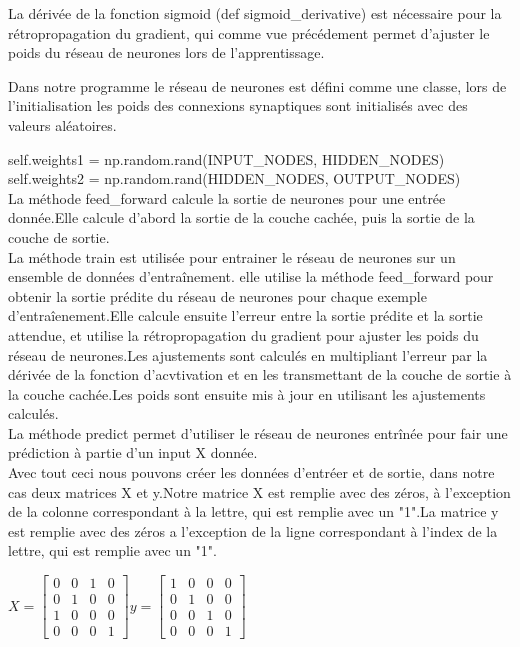 \documentclass{article}
\def\abc#1{\begingroup\escapechar-1 \expandafter\string\csname#1\endcsname\endgroup}
\begin{document}
La dérivée de la fonction sigmoid (def \abc{sigmoid_derivative}) est nécessaire pour la rétropropagation du gradient, qui comme vue précédement permet d'ajuster le poids du réseau de neurones lors de l'apprentissage. \

Dans notre programme le réseau de neurones est défini comme une classe, lors de l'initialisation les poids des connexions synaptiques sont initialisés avec des valeurs aléatoires.

\abc{self.weights1 = np.random.rand(INPUT_NODES, HIDDEN_NODES)} \\

\abc{self.weights2 = np.random.rand(HIDDEN_NODES, OUTPUT_NODES)} \\ 

La méthode \abc{feed_forward} calcule la sortie de neurones pour une entrée donnée.Elle calcule d'abord la sortie de la couche cachée, puis la sortie de la couche de sortie. \\ 

La méthode train est utilisée pour entrainer le réseau de neurones sur un ensemble de données d'entraînement. elle utilise la méthode \abc{feed_forward} pour obtenir la sortie prédite du réseau de neurones pour chaque exemple d'entraîenement.Elle calcule ensuite l'erreur entre la sortie prédite et la sortie attendue, et utilise la rétropropagation du gradient pour ajuster les poids du réseau de neurones.Les ajustements sont calculés en multipliant l'erreur par la dérivée de la fonction d'acvtivation et en les transmettant de la couche de sortie à la couche cachée.Les poids sont ensuite mis à jour en utilisant les ajustements calculés. \\ 

La méthode predict permet d'utiliser le réseau de neurones entrînée pour fair une prédiction à partie d'un input X donnée. \\ 

Avec tout ceci nous pouvons créer les données d'entréer et de sortie, dans notre cas deux matrices X et y.Notre matrice X est remplie avec des zéros, à l'exception de la colonne correspondant à la lettre, qui est remplie avec un "1".La matrice y est remplie avec des zéros a l'exception de la ligne correspondant à l'index de la lettre, qui est remplie avec un "1". \\
\begin{center}
    
$X = \begin{bmatrix}
0 & 0 & 1 & 0 \\
0 & 1 & 0 & 0 \\
1 & 0 & 0 & 0 \\
0 & 0 & 0 & 1 
\end{bmatrix} 
y = \begin{bmatrix}
1 & 0 & 0 & 0 \\
0 & 1 & 0 & 0 \\
0 & 0 & 1 & 0 \\
0 & 0 & 0 & 1 
\end{bmatrix} $

\end{center}
\end{document}
